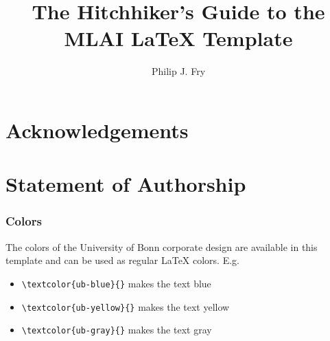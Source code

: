 \documentclass[ba,logo]{mlai-thesis}
\title{The Hitchhiker's Guide to the MLAI \LaTeX{} Template}
\author{Philip J. Fry\\\birthinfo{August 14, 1974 in Brooklyn, New York}}
\begin{document}
	
	\frontmatter 
	
	\maketitle 
	
	\cleardoublepage
	\begin{abstract}
		\blindtext[3]
	\end{abstract}

	\chapter*{Acknowledgements}  
	
	\cleardoublepage
	\chapter*{Statement of Authorship} 
	 
	
	\cleardoublepage
	\tableofcontents
	
	
	\mainmatter
	
	 
	
	
	
	 
	
	

	\subsection{Colors}
	The colors of the University of Bonn corporate design are available in this template and can be used as regular \LaTeX{} colors. E.g.
	\begin{itemize}
	\item \verb+\textcolor{ub-blue}{}+ \textcolor{ub-blue}{makes the text blue}
	\item \verb+\textcolor{ub-yellow}{}+ \textcolor{ub-yellow}{makes the text yellow}
	\item \verb+\textcolor{ub-gray}{}+ \textcolor{ub-gray}{makes the text gray}
	\end{itemize}
	
	 
	
	 
	
\end{document}
